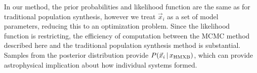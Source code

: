 \documentclass[12pt, preprint]{aastex}
\newcommand{\given}{\,|\,}
\newcommand{\dd}{\mathrm{d}}
\begin{document}





In our method, the prior probabilities and likelihood function are the same as for traditional population synthesis, however we treat $\vec{x}_i$ as a set of model parameters, reducing this to an optimization problem. Since the likelihood function is restricting, the efficiency of computation between the MCMC method described here and the traditional population synthesis method is substantial. Samples from the posterior distribution provide $P(\vec{x}_i \given x_{\rm HMXB})$, which can provide astrophysical implication about how individual systems formed.
\end{document}
